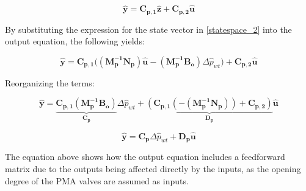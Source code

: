 \begin{equation}
\bm{\hat{y}} = \bm{C_{p,1}} \bm{\hat{z}}  + \bm{C_{p,2}}\bm{\hat{u}}  
 \label{statespace_5}
\end{equation}

By substituting the expression for the state vector in \eqref{statespace_2} into the output equation, the following yields:

\begin{equation}
\bm{\hat{y}} = \bm{C_{p,1}} \big((\bm{M_p^{-1}}\bm{N_p})\bm{\hat{u}} - (\bm{M_p^{-1}}\bm{B_o})\Delta \hat{p}_{wt}\big)  + \bm{C_{p,2}}\bm{\hat{u}}  
 \label{statespace_6}
\end{equation}

Reorganizing the terms:

\begin{equation}
\bm{\hat{y}} = \underbrace{\bm{C_{p,1}} (\bm{M_p^{-1}}\bm{B_o})}_\text{$\bm{C_{p}}$} \Delta \hat{p}_{wt} + \underbrace{(\bm{C_{p,1}} (-(\bm{M_p^{-1}}\bm{N_p})) + \bm{C_{p,2}})}_\text{$\bm{D_p}$} \bm{\hat{u}}  
 \label{finaloutput}
\end{equation}

\begin{equation}
  \bm{\hat{y}} = \bm{C_{p}} \Delta \hat{p}_{wt} + \bm{D_p} \bm{\hat{u}} 
  \label{outputfinaleq}
\end{equation}

The equation above shows how the output equation includes a feedforward matrix due to the outputs being affected directly by the inputs, as the opening degree of the PMA valves are assumed as inputs.

